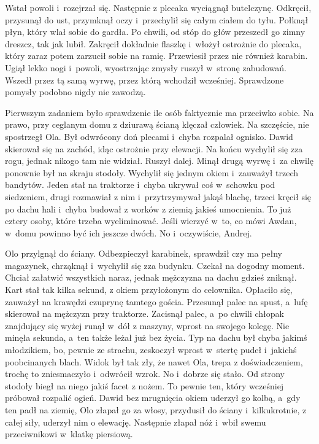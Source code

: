 \documentclass[../MAIN.tex]{subfiles}
\begin{document}
Wstał powoli i~rozejrzał się. Następnie z plecaka wyciągnął butelczynę. Odkręcił, przysunął do ust, przymknął oczy i~przechylił się całym ciałem do tyłu. Połknął płyn, który wlał sobie do gardła. Po chwili, od stóp do głów przeszedł go zimny dreszcz, tak jak lubił. Zakręcił dokładnie flaszkę i~włożył ostrożnie do plecaka, który zaraz potem zarzucił sobie na ramię. Przewiesił przez nie również karabin. Ugiął lekko nogi i~powoli, wyostrzając zmysły ruszył w~stronę zabudowań. Wszedł przez tą samą wyrwę, przez którą wchodził wcześniej. Sprawdzone pomysły podobno nigdy nie zawodzą.

Pierwszym zadaniem było sprawdzenie ile osób faktycznie ma przeciwko sobie. Na prawo, przy ceglanym domu z dziurawą ścianą klęczał człowiek. Na szczęście, nie spostrzegł Ola. Był odwrócony doń plecami i~chyba rozpalał ognisko. Dawid skierował się na zachód, idąc ostrożnie przy elewacji. Na końcu wychylił się zza rogu, jednak nikogo tam nie widział. Ruszył dalej. Minął drugą wyrwę i~za chwilę ponownie był na skraju stodoły. Wychylił się jednym okiem i~zauważył trzech bandytów. Jeden stał na traktorze i~chyba ukrywał coś w~schowku pod siedzeniem, drugi rozmawiał z nim i~przytrzymywał jakąś blachę, trzeci kręcił się po dachu hali i~chyba budował z worków z ziemią jakieś umocnienia. To już cztery osoby, które trzeba wyeliminować. Jeśli wierzyć w~to, co mówi Awdan, w~domu powinno być ich jeszcze dwóch. No i~oczywiście, Andrej.

Olo przylgnął do ściany. Odbezpieczył karabinek, sprawdził czy ma pełny magazynek, chrząknął i~wychylił się zza budynku. Czekał na dogodny moment. Chciał załatwić wszystkich naraz, jednak mężczyzna na dachu gdzieś zniknął. Kart stał tak kilka sekund, z okiem przyłożonym do celownika. Opłaciło się, zauważył na krawędzi czuprynę tamtego gościa. Przesunął palec na spust, a~lufę skierował na mężczyzn przy traktorze. Zacisnął palec, a~po chwili chłopak znajdujący się wyżej runął w~dół z maszyny, wprost na swojego kolegę. Nie minęła sekunda, a~ten także leżał już bez życia. Typ na dachu był chyba jakimś młodzikiem, bo, pewnie ze strachu, zeskoczył wprost w~stertę pudeł i~jakichś poobcinanych blach. Widok był tak zły, że nawet Ola, trepa z doświadczeniem, trochę to zniesmaczyło i~odwrócił wzrok. No i~dobrze się stało. Od strony stodoły biegł na niego jakiś facet z nożem. To pewnie ten, który wcześniej próbował rozpalić ogień. Dawid bez mrugnięcia okiem uderzył go kolbą, a~gdy ten padł na ziemię, Olo złapał go za
włosy, przydusił do ściany i~kilkukrotnie, z całej siły, uderzył nim o elewację. Następnie złapał nóż i~wbił swemu przeciwnikowi w~klatkę piersiową.
\end{document}
